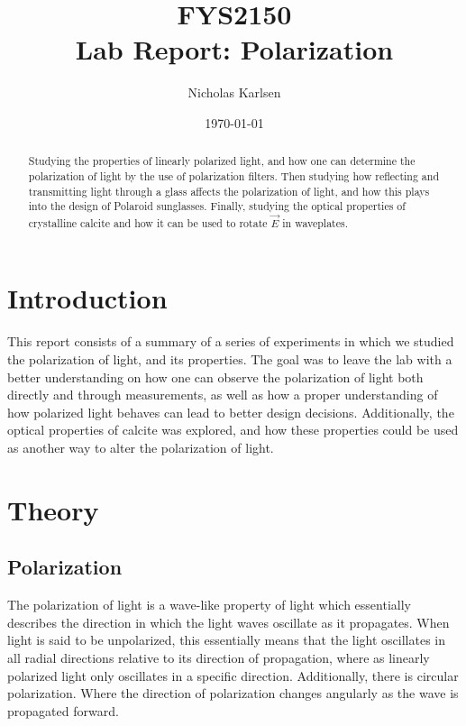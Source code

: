 \documentclass[%
 reprint,
 amsmath,amssymb,
 aps,
]{revtex4-1}
\begin{document}

\title{FYS2150 \\
Lab Report: Polarization}%

\author{Nicholas Karlsen}

\date{\today}%



\begin{abstract}
  Studying the properties of linearly polarized light, and how one can determine the polarization of light by the use of polarization filters. Then studying how reflecting and transmitting light through a glass affects the polarization of light, and how this plays into the design of Polaroid sunglasses. Finally, studying the optical properties of crystalline calcite and how it can be used to rotate $\vec E$ in waveplates.
\end{abstract}

\maketitle

\section{\label{sect:intro}Introduction}

    This report consists of a summary of a series of experiments in which we studied the polarization of light, and its properties. The goal was to leave the lab with a better understanding on how one can observe the polarization of light both directly and through measurements, as well as how a proper understanding of how polarized light behaves can lead to better design decisions. Additionally, the optical properties of calcite was explored, and how these properties could be used as another way to alter the polarization of light.
  

\section{\label{sect:theory}Theory}
  
  \subsection{Polarization}
    The polarization of light is a wave-like property of light which essentially describes the direction in which the light waves oscillate as it propagates.
    When light is said to be unpolarized, this essentially means that the light oscillates in all radial directions relative to its direction of propagation, where as linearly polarized light only oscillates in a specific direction. Additionally, there is circular polarization. Where the direction of polarization changes angularly as the wave is propagated forward.
\end{document}
